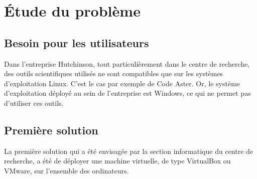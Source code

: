 
\section{Étude du problème}


\subsection{Besoin pour les utilisateurs}

Dans l'entreprise Hutchinson, tout particulièrement dans le centre de recherche, des outils scientifiques utilisés ne sont compatibles que sur les systèmes d'exploitation Linux.
C'est le cas par exemple de Code Aster.
Or, le système d'exploitation déployé au sein de l'entreprise est Windows, ce qui ne permet pas d'utiliser ces outils.
\\





\subsection{Première solution}

La première solution qui a été envisagée par la section informatique du centre de recherche, a été de déployer une machine virtuelle, de type VirtualBox ou VMware, sur l'ensemble des ordinateurs.
\\


